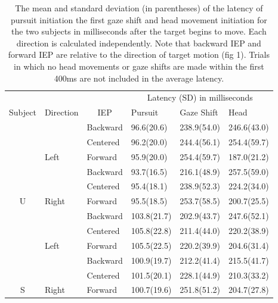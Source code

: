 \documentclass[12pt]{article}
\begin{document}
\begin{table}[h]
\begin{tabular}{clllll}
\multicolumn{1}{l}{} &  & \multicolumn{1}{c}{} & \multicolumn{3}{c}{Latency (SD) in milliseconds} \\ \cline{4-6} 
Subject & \multicolumn{1}{c}{Direction} & \multicolumn{1}{c}{IEP} & Pursuit & Gaze Shift & Head \\
 & \cellcolor[HTML]{EFEFEF} & \cellcolor[HTML]{EFEFEF}Backward & \cellcolor[HTML]{EFEFEF}96.6(20.6) & \cellcolor[HTML]{EFEFEF}238.9(54.0) & \cellcolor[HTML]{EFEFEF}246.6(43.0) \\
 & \cellcolor[HTML]{EFEFEF} & \cellcolor[HTML]{EFEFEF}Centered & \cellcolor[HTML]{EFEFEF}96.2(20.0) & \cellcolor[HTML]{EFEFEF}244.4(56.1) & \cellcolor[HTML]{EFEFEF}254.4(59.7) \\
 & \multirow{-3}{*}{\cellcolor[HTML]{EFEFEF}Left} & \cellcolor[HTML]{EFEFEF}Forward & \cellcolor[HTML]{EFEFEF}95.9(20.0) & \cellcolor[HTML]{EFEFEF}254.4(59.7) & \cellcolor[HTML]{EFEFEF}187.0(21.2) \\
 &  & Backward & 93.7(16.5) & 216.1(48.9) & 257.5(59.0) \\
 &  & Centered & 95.4(18.1) & 238.9(52.3) & 224.2(34.0) \\
\multirow{-6}{*}{U} & \multirow{-3}{*}{Right} & Forward & 95.5(18.5) & 253.7(58.5) & 200.7(25.5) \\ \cline{1-1}
 & \cellcolor[HTML]{EFEFEF} & \cellcolor[HTML]{EFEFEF}Backward & \cellcolor[HTML]{EFEFEF}103.8(21.7) & \cellcolor[HTML]{EFEFEF}202.9(43.7) & \cellcolor[HTML]{EFEFEF}247.6(52.1) \\
 & \cellcolor[HTML]{EFEFEF} & \cellcolor[HTML]{EFEFEF}Centered & \cellcolor[HTML]{EFEFEF}105.8(22.8) & \cellcolor[HTML]{EFEFEF}211.4(44.0) & \cellcolor[HTML]{EFEFEF}220.2(38.9) \\
 & \multirow{-3}{*}{\cellcolor[HTML]{EFEFEF}Left} & \cellcolor[HTML]{EFEFEF}Forward & \cellcolor[HTML]{EFEFEF}105.5(22.5) & \cellcolor[HTML]{EFEFEF}220.2(39.9) & \cellcolor[HTML]{EFEFEF}204.6(31.4) \\
 &  & Backward & 100.9(19.7) & 212.2(41.4) & 215.5(41.7) \\
 &  & Centered & 101.5(20.1) & 228.1(44.9) & 210.3(33.2) \\
\multirow{-6}{*}{S} & \multirow{-3}{*}{Right} & Forward & 100.7(19.6) & 251.8(51.2) & 204.7(27.8)
\end{tabular}
\caption[Latency]{The mean and standard deviation (in parentheses) of the latency of pursuit initiation the first gaze shift and head movement initiation for the two subjects in milliseconds after the target begins to move. Each direction is calculated independently. Note that backward IEP and forward IEP are relative to the direction of target motion (fig 1).  Trials in which no head movements or gaze shifts are made within the first 400ms are not included in the average latency.}
\end{table}
\end{document}
